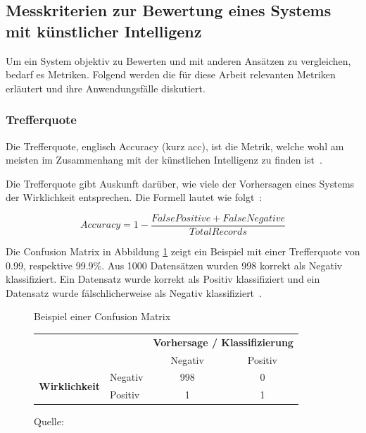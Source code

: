 \subsection{Messkriterien zur Bewertung eines Systems mit künstlicher Intelligenz}
\label{chap:metrices}

Um ein System objektiv zu Bewerten und mit anderen Ansätzen zu vergleichen, bedarf es Metriken. Folgend werden die für diese Arbeit relevanten Metriken erläutert und ihre Anwendungsfälle diskutiert.

\subsubsection{Trefferquote}

Die Trefferquote, englisch Accuracy (kurz acc), ist die Metrik, welche wohl am meisten im Zusammenhang mit der künstlichen Intelligenz zu finden ist~\autocite{TDSAccuracy}.

Die Trefferquote gibt Auskunft darüber, wie viele der Vorhersagen eines Systems der Wirklichkeit entsprechen. Die Formell lautet wie folgt~\autocite{TDSAccuracy}: 

$$Accuracy = 1 - \frac{False Positive + False Negative}{Total Records}$$

Die Confusion Matrix in Abbildung \ref{cm-sample} zeigt ein Beispiel mit einer Trefferquote von 0.99, respektive 99.9\%. Aus 1000 Datensätzen wurden 998 korrekt als Negativ klassifiziert. Ein Datensatz wurde korrekt als Positiv klassifiziert und ein Datensatz wurde fälschlicherweise als Negativ klassifiziert~\autocite{TDSAccuracy}.

\begin{figure}[h!]
    \centering
    \captionsetup{width=.9\linewidth}
    \caption{Beispiel einer Confusion Matrix}
    \label{cm-sample}
    \def\arraystretch{1.5}
    \begin{tabular}{llcc}
        \multicolumn{2}{l}{}                                                                       & \multicolumn{2}{c}{\textbf{Vorhersage / Klassifizierung}}   \\ \cline{3-4} 
        \multicolumn{1}{c}{\textbf{}}                               & \multicolumn{1}{l|}{}        & \multicolumn{1}{c|}{Negativ} & \multicolumn{1}{c|}{Positiv} \\ \cline{2-4} 
        \multicolumn{1}{l|}{\multirow{2}{*}{\textbf{Wirklichkeit}}} & \multicolumn{1}{l|}{Negativ} & \multicolumn{1}{c|}{998}    & \multicolumn{1}{c|}{0}       \\ \cline{2-4} 
        \multicolumn{1}{l|}{}                                       & \multicolumn{1}{l|}{Positiv} & \multicolumn{1}{c|}{1}       & \multicolumn{1}{c|}{1}       \\ \cline{2-4} 
    \end{tabular}
    \caption*{Quelle: \textcite{TDSAccuracy}}
\end{figure}

